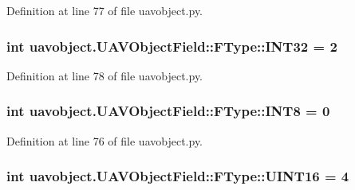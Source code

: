 \-Definition at line 77 of file uavobject.\-py.

\hypertarget{classuavobject_1_1_u_a_v_object_field_1_1_f_type_a4fd3782a98865e5ea790e3793cd39982}{
\subsubsection[{\-I\-N\-T32}]{\setlength{\rightskip}{0pt plus 5cm}int {\bf uavobject.\-U\-A\-V\-Object\-Field\-::\-F\-Type\-::\-I\-N\-T32} = 2}}\label{classuavobject_1_1_u_a_v_object_field_1_1_f_type_a4fd3782a98865e5ea790e3793cd39982}


\-Definition at line 78 of file uavobject.\-py.

\hypertarget{classuavobject_1_1_u_a_v_object_field_1_1_f_type_af926b1b994b6458f1c7da310f50488b0}{
\subsubsection[{\-I\-N\-T8}]{\setlength{\rightskip}{0pt plus 5cm}int {\bf uavobject.\-U\-A\-V\-Object\-Field\-::\-F\-Type\-::\-I\-N\-T8} = 0}}\label{classuavobject_1_1_u_a_v_object_field_1_1_f_type_af926b1b994b6458f1c7da310f50488b0}


\-Definition at line 76 of file uavobject.\-py.

\hypertarget{classuavobject_1_1_u_a_v_object_field_1_1_f_type_a727b26f4ed04d856651d36166ba5e3d7}{
\subsubsection[{\-U\-I\-N\-T16}]{\setlength{\rightskip}{0pt plus 5cm}int {\bf uavobject.\-U\-A\-V\-Object\-Field\-::\-F\-Type\-::\-U\-I\-N\-T16} = 4}}\label{classuavobject_1_1_u_a_v_object_field_1_1_f_type_a727b26f4ed04d856651d36166ba5e3d7}


